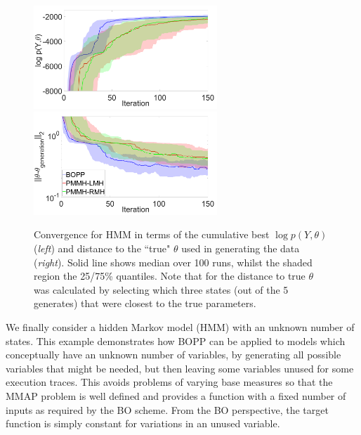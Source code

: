 
\begin{figure}[t]
	\centering
	\includegraphics[width=2.72in]{hmm/hmm_ML}
	\includegraphics[width=2.72in]{hmm/hmm_distance}
	\caption{Convergence for HMM in terms of the cumulative best $\log p\left(Y,\theta\right)$ (\emph{left}) and distance to the ``true" $\theta$ used in generating the data (\emph{right}). Solid line shows median over 100 runs, whilst the shaded region the 25/75\% quantiles.  Note that for the distance to true $\theta$ was calculated by selecting which three states (out of the 5 generates) that were closest to the true parameters.  \label{fig:hmm}}
\end{figure}

We finally consider a hidden Markov model (HMM) with an unknown number of states.  This example demonstrates how BOPP can be applied to models which conceptually have an unknown number of variables, by generating all possible variables that might be needed, but then leaving some variables unused for some execution traces.  This avoids problems of varying base measures so that the MMAP problem is well defined  and provides a function with a fixed number of inputs as required by the BO scheme.  From the BO perspective, the target function is simply constant for variations in an unused variable.

